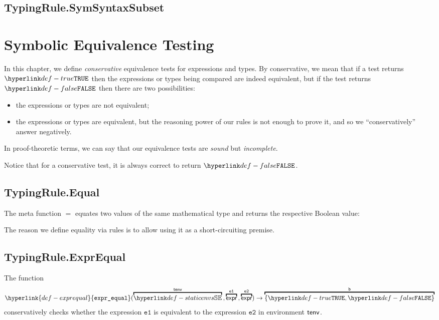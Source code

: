 \documentclass{book}
\newcommand\exprequal[0]{\hyperlink{def-exprequal}{\texttt{expr\_equal}}}
\newcommand\veone[0]{\texttt{e1}}
\newcommand\vetwo[0]{\texttt{e2}}
\begin{document}
\section{TypingRule.SymSyntaxSubset}
\hypertarget{def-symsyntaxsubset}{}

\chapter{Symbolic Equivalence Testing \label{chap:symbolicequivalencetesting}}

In this chapter, we define \emph{conservative} equivalence tests for expressions and types.
By conservative, we mean that if a test returns $\True$ then the expressions or types being
compared are indeed equivalent, but if the test returns $\False$ then
there are two possibilities:
\begin{itemize}
  \item the expressions or types are not equivalent;
  \item the expressions or types are equivalent, but the reasoning power of our rules
  is not enough to prove it, and so we ``conservatively'' answer negatively.
\end{itemize}
In proof-theoretic terms, we can say that our equivalence tests are \emph{sound} but \emph{incomplete}.

Notice that for a conservative test, it is always correct to return $\False$.

\section{TypingRule.Equal}
\hypertarget{def-equal}{}
The meta function $\equal$ equates two values of the same mathematical type and returns
the respective Boolean value:
The reason we define equality via rules is to allow using it as a short-circuiting premise.

\section{TypingRule.ExprEqual}
The function
\[
  \exprequal(\overname{\staticenvs}{\tenv} \aslsep \overname{\expr}{\veone} \aslsep \overname{\expr}{\vetwo}) \rightarrow \overname{\{\True, \False\}}{\vb}
\]
conservatively checks whether the expression $\veone$ is equivalent to the expression $\vetwo$ in environment $\textsf{tenv}$.
\end{document}
